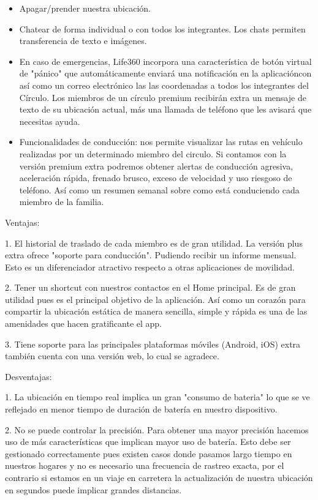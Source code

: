 \begin{itemize}
    \item Apagar/prender nuestra ubicación.
    \item Chatear de forma individual o con todos los integrantes. Los chats permiten transferencia de texto e imágenes. 
    \item En caso de emergencias, Life360 incorpora una característica de botón virtual de "pánico" que automáticamente enviará una notificación en la aplicacióncon así como un correo electrónico las las coordenadas a todos los integrantes del Círculo. Los miembros de un círculo premium recibirán extra un mensaje de texto de su ubicación actual, más una llamada de teléfono que les avisará que necesitas ayuda.
    \item Funcionalidades de conducción: nos permite visualizar las rutas en vehículo realizadas por un determinado miembro del circulo. Si contamos con la versión premium extra podremos obtener alertas de conducción agresiva, aceleración rápida, frenado brusco, exceso de velocidad y uso riesgoso de teléfono. Así como un resumen semanal sobre como está conduciendo cada miembro de la familia.\cite{orientatech}
\end{itemize}

Ventajas:

1. El historial de traslado de cada miembro es de gran utilidad. La versión plus extra ofrece "soporte para conducción". Pudiendo recibir un informe mensual. Esto es un diferenciador atractivo respecto a otras aplicaciones de movilidad.

2. Tener un shortcut con nuestros contactos en el Home principal. Es de gran utilidad pues es el principal objetivo de la aplicación. Así como un corazón para compartir la ubicación estática de manera sencilla, simple y rápida es una de las amenidades que hacen gratificante el app.

3. Tiene soporte para las principales plataformas móviles (Android, iOS) extra también cuenta con una versión web, lo cual se agradece.


Desventajas:

1. La ubicación en tiempo real implica un gran "consumo de bateria" lo que se ve reflejado en menor tiempo de duración de batería en nuestro dispositivo.

2. No se puede controlar la precisión. Para obtener una mayor precisión hacemos uso de más características que implican mayor uso de batería. Esto debe ser gestionado correctamente pues existen casos donde pasamos largo tiempo en nuestros hogares y no es necesario una frecuencia de rastreo exacta, por el contrario si estamos en un viaje en carretera la actualización de nuestra ubicación en segundos puede implicar grandes distancias.

